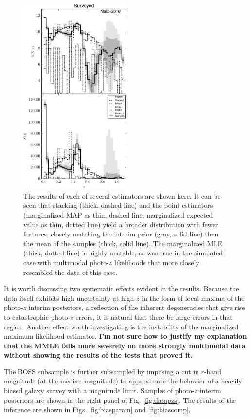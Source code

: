 \documentclass[preprint]{aastex}
\begin{document}
\begin{figure}
\includegraphics[width=0.5\textwidth]{figs/boss/comps.pdf}
\caption{The results of each of several estimators are shown here.  It can be 
seen that stacking (thick, dashed line) and the point estimators (marginalized 
MAP as thin, dashed line; marginalized expected value as thin, dotted line) 
yield a broader distribution with fewer features, closely matching the interim 
prior (gray, solid line) than the mean of the samples (thick, solid line).  The 
marginalized MLE (thick, dotted line) is highly unstable, as was true in the 
simulated case with multimodal photo-$z$ likelihoods that more closely 
resembled the data of this case.}
\label{fig:datacomp}
\end{figure}

It is worth discussing two systematic effects evident in the results.  Because 
the data itself exhibits high uncertainty at high $z$ in the form of local 
maxima of the photo-$z$ interim posteriors, a reflection of the inherent 
degeneracies that give rise to catastrophic photo-$z$ errors, it is natural 
that there be large errors in that region.  Another effect worth investigating 
is the instability of the marginalized maximum likelihood estimator.  
\textbf{I'm not sure how to justify my explanation that the MMLE fails more 
severely on more strongly multimodal data without showing the results of the 
tests that proved it.}

The BOSS subsample is further subsampled by imposing a cut in $r$-band 
magnitude (at the median magnitude) to approximate the behavior of a heavily 
biased galaxy survey with a magnitude limit.  Samples of photo-$z$ interim 
posteriors are shown in the right panel of Fig. \ref{fig:datapzs}.  The results 
of the inference are shown in Figs. \ref{fig:biasparam} and \ref{fig:biascomp}. 
 
\end{document}
